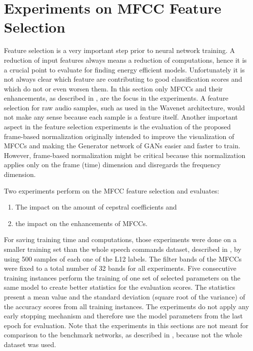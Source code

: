 
\section{Experiments on MFCC Feature Selection}\label{sec:exp_fs}
Feature selection is a very important step prior to neural network training.
A reduction of input features always means a reduction of computations, hence it is a crucial point to evaluate for finding energy efficient models.
Unfortunately it is not always clear which feature are contributing to good classification scores and which do not or even worsen them.
In this section only MFCCs and their enhancements, as described in , are the focus in the experiments.
A feature selection for raw audio samples, such as used in the Wavenet architecture, would not make any sense because each sample is a feature itself.
Another important aspect in the feature selection experiments is the evaluation of the proposed frame-based normalization  originally intended to improve the visualization of MFCCs and making the Generator network of GANs easier and faster to train.
However, frame-based normalization might be critical because this normalization applies only on the frame (time) dimension and disregards the frequency dimension.

Two experiments perform on the MFCC feature selection and evaluates:
\begin{enumerate}
    \item The impact on the amount of cepstral coefficients and
    \item the impact on the enhancements of MFCCs.
\end{enumerate}
For saving training time and computations, those experiments were done on a smaller training set than the whole speech commands dataset, described in , by using 500 samples of each one of the L12 labels.
The filter bands of the MFCCs were fixed to a total number of 32 bands for all experiments.
Five consecutive training instances perform the training of one set of selected parameters on the same model to create better statistics for the evaluation scores.
The statistics present a mean value and the standard deviation (square root of the variance) of the accuracy scores from all training instances.
The experiments do not apply any early stopping mechanism and therefore use the model parameters from the last epoch for evaluation.
Note that the experiments in this sections are not meant for comparison to the benchmark networks, as described in , because not the whole dataset was used.


